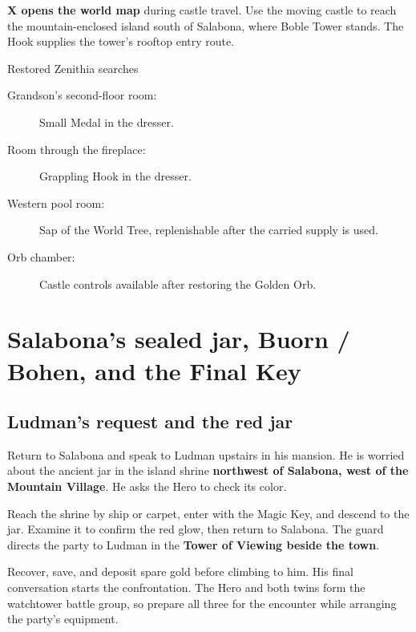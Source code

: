 \textbf{X opens the world map} during castle travel.
Use the moving castle to reach the mountain-enclosed island
south of Salabona, where Boble Tower stands. The Hook supplies
the tower's rooftop entry route.

\begin{routecheck}{Restored Zenithia searches}
\begin{description}
  \item[Grandson's second-floor room:] Small Medal in the dresser.
  \item[Room through the fireplace:] Grappling Hook in the dresser.
  \item[Western pool room:] Sap of the World Tree, replenishable
    after the carried supply is used.
  \item[Orb chamber:] Castle controls available after restoring
    the Golden Orb.
\end{description}
\end{routecheck}

\section{Salabona's sealed jar, Buorn / Bohen, and the Final Key}

\subsection*{Ludman's request and the red jar}

Return to Salabona and speak to Ludman upstairs in his mansion.
He is worried about the ancient jar in the island shrine
\textbf{northwest of Salabona, west of the Mountain Village}.
He asks the Hero to check its color.

Reach the shrine by ship or carpet, enter with the Magic Key,
and descend to the jar. Examine it to confirm the red glow,
then return to Salabona. The guard directs the party to
Ludman in the \textbf{Tower of Viewing beside the town}.

Recover, save, and deposit spare gold before climbing to him.
His final conversation starts the confrontation. The Hero and
both twins form the watchtower battle group, so prepare all
three for the encounter while arranging the party's equipment.

